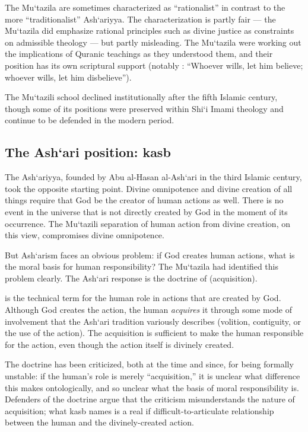 The Mu`tazila are sometimes characterized as ``rationalist'' in
contrast to the more ``traditionalist'' Ash`ariyya. The
characterization is partly fair --- the Mu`tazila did emphasize
rational principles such as divine justice as constraints on
admissible theology --- but partly misleading. The Mu`tazila were
working out the implications of Quranic teachings as they understood
them, and their position has its own scriptural support (notably
: ``Whoever wills, let him believe; whoever wills, let
him disbelieve'').

The Mu`tazili school declined institutionally after the fifth
Islamic century, though some of its positions were preserved within
Shi`i Imami theology and continue to be defended in the modern
period.

\subsection{The Ash`ari position: kasb}

The Ash`ariyya, founded by Abu al-Hasan al-Ash`ari in the third
Islamic century, took the opposite starting point. Divine omnipotence
and divine creation of all things require that God be the creator
of human actions as well. There is no event in the universe that is
not directly created by God in the moment of its occurrence. The
Mu`tazili separation of human action from divine creation, on this
view, compromises divine omnipotence.

But Ash`arism faces an obvious problem: if God creates human
actions, what is the moral basis for human responsibility? The
Mu`tazila had identified this problem clearly. The Ash`ari response
is the doctrine of  (acquisition).

\begin{conceptbox}
 is the technical term for the human role in actions
that are created by God. Although God creates the action, the human
\emph{acquires} it through some mode of involvement that the
Ash`ari tradition variously describes (volition, contiguity, or
the use of the action). The acquisition is sufficient to make the
human responsible for the action, even though the action itself is
divinely created.
\end{conceptbox}

The doctrine has been criticized, both at the time and since, for
being formally unstable: if the human's role is merely
``acquisition,'' it is unclear what difference this makes
ontologically, and so unclear what the basis of moral responsibility
is. Defenders of the doctrine argue that the criticism misunderstands
the nature of acquisition; what kasb names is a real if difficult-to-articulate
relationship between the human and the divinely-created action.

